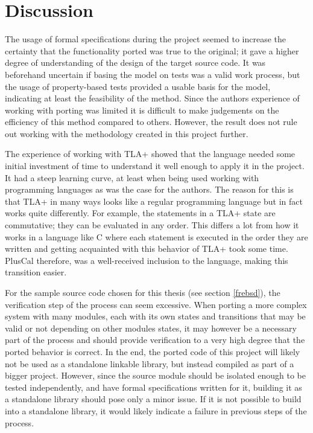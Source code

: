 
\section{Discussion}\label{discussion}

The usage of formal specifications during the project seemed to increase the certainty that the functionality ported was true to the original; it gave a higher degree of understanding of the design of the target source code. It was beforehand uncertain if basing the model on tests was a valid work process, but the usage of property-based tests provided a usable basis for the model, indicating at least the feasibility of the method. Since the authors experience of working with porting was limited it is difficult to make judgements on the efficiency of this method compared to others. However, the result does not rule out working with the methodology created in this project further.  

The experience of working with TLA+ showed that the language needed some initial investment of time to understand it well enough to apply it in the project. It had a steep learning curve, at least when being used working with programming languages as was the case for the authors. The reason for this is that TLA+ in many ways looks like a regular programming language but in fact works quite differently. For example, the statements in a TLA+ state are commutative; they can be evaluated in any order. This differs a lot from how it works in a language like C where each statement is executed in the order they are written and getting acquainted with this behavior of TLA+ took some time. PlusCal therefore, was a well-received inclusion to the language, making this transition easier. 

For the sample source code chosen for this thesis (see section \ref{frebsd}), the verification step of the process can seem excessive. When porting a more complex system with many modules, each with its own states and transitions that may be valid or not depending on other modules states, it may however be a necessary part of the process and should provide verification to a very high degree that the ported behavior is correct. In the end, the ported code of this project will likely not be used as a standalone linkable library, but instead compiled as part of a bigger project. However, since the source module should be isolated enough to be tested independently, and have formal specifications written for it, building it as a standalone library should pose only a minor issue. If it is not possible to build into a standalone library, it would likely indicate a failure in previous steps of the process.

